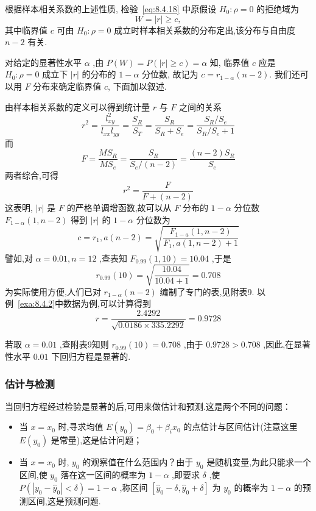 根据样本相关系数的上述性质, 检验~\ref{eq:8.4.18} 中原假设 $H_0: \rho=0$ 的拒绝域为 
\begin{equation*}
  W={|r| \ge c},
\end{equation*}
其中临界值 $c$ 可由 $H_0:\rho =0$ 成立时样本相关系数的分布定出,该分布与自由度 $n-2$ 有关.

对给定的显著性水平 $\alpha$ ,由 $P(W)=P(|r|\ge c)=\alpha$ 知, 临界值 $c$ 应是 $H_0:\rho =0$ 成立下 $|r|$ 的分布的 $1-\alpha$ 分位数, 故记为 $c = r_{1-\alpha}(n-2)$. 我们还可以用 $F$ 分布来确定临界值 $c$, 下面加以叙述.

由样本相关系数的定义可以得到统计量 $r$ 与 $F$ 之间的关系
\begin{equation*}
r^{2} =\frac{l_{x y}^{2}}{l_{x x} l_{y y}}=\frac{S_{R}}{S_{T}}=\frac{S_{R}}{S_{R}+S_{e}}=\frac{S_{R} / S_{e}}{S_{R} / S_{e}+1} 
\end{equation*}
而
\begin{equation*}
F=\frac{MS_R}{MS_e}=\frac{S_R}{S_e/\left( n-2 \right)}=\frac{\left( n-2 \right) S_R}{S_e}
\end{equation*}
两者综合,可得
\begin{equation*}
r^2=\frac{F}{F+(n-2)}  
\end{equation*}
这表明, $|r|$ 是 $F$ 的严格单调增函数,故可以从 $F$ 分布的 $1-\alpha$ 分位数 $F_{1-\alpha}(1,n-2)$ 得到 $|r|$ 的 $1-\alpha$ 分位数为
\begin{equation}
c=r_{1}, a(n-2)=\sqrt{\frac{F_{1-a}(1, n-2)}{F_{1}, a(1, n-2)+1}}
\end{equation}
譬如,对 $\alpha =0.01,n=12$ ,查表知 $F_{0.99}(1,10)=10.04$ ,于是
\begin{equation}
r_{0.99}(10)=\sqrt{\frac{10.04}{10.04+1}}=0.708
\end{equation}
为实际使用方便,人们已对 $r_{1-\alpha}(n-2)$ 编制了专门的表,见附表9.
以例~\ref{exa:8.4.2}中数据为例,可以计算得到
\begin{equation}
r=\frac{2.4292}{\sqrt{0.0186 \times 335.2292}}=0.9728
\end{equation}

若取 $\alpha =0.01$ ,查附表9知则 $r_{0.99}(10)=0.708$ ,由于 $0.9728>0.708$ ,因此,在显著性水平 $0.01$ 下回归方程是显著的.


\subsubsection{估计与检测}\label{sec:8.4.5}

当回归方程经过检验是显著的后,可用来做估计和预测.这是两个不同的问题：
\begin{itemize}
    \item 当 $x=x_0$ 时,寻求均值 $E(y_0)=\beta_0+\beta_ix_0$ 的点估计与区间估计(注意这里 $E(y_0)$ 是常量),这是估计问题；
    \item 当 $x=x_0$ 时, $y_0$ 的观察值在什么范围内？由于 $y_0$ 是随机变量,为此只能求一个区间,使 $y_0$ 落在这一区间的概率为 $1-\alpha$ ,即要求 $\delta$ ,使 $P(|y_0-\hat{y}_0|<\delta)=1-\alpha$ ,称区间 $\left[\hat{y}_{0}-\delta, \hat{y}_{0}+\delta\right]$ 为 $y_0$ 的概率为 $1-\alpha$ 的预测区间,这是预测问题.
\end{itemize}

